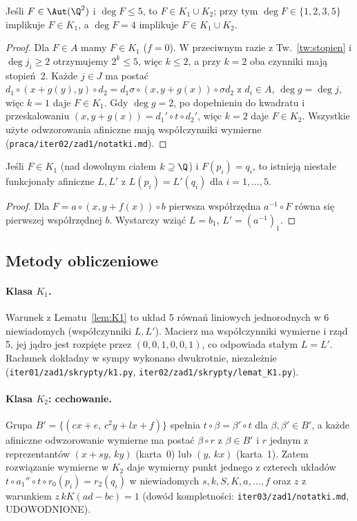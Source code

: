 \begin{stwierdzenie}\label{st:redukcja}
Jeśli $F\in\Aut(\Q^2)$ i $\deg F\le5$, to $F\in K_1\cup K_2$; przy tym $\deg F\in\{1,2,3,5\}$
implikuje $F\in K_1$, a $\deg F=4$ implikuje $F\in K_1\cup K_2$.
\end{stwierdzenie}
\begin{proof}
Dla $F\in A$ mamy $F\in K_1$ ($f=0$). W przeciwnym razie z Tw.~\ref{tw:stopien} i
$\deg j_i\ge2$ otrzymujemy $2^k\le5$, więc $k\le2$, a przy $k=2$ oba czynniki mają stopień~2.
Każde $j\in J$ ma postać $d_1\circ(x+g(y),y)\circ d_2=d_1\sigma\circ(x,y+g(x))\circ\sigma d_2$
z $d_i\in A$, $\deg g=\deg j$, więc $k=1$ daje $F\in K_1$. Gdy $\deg g=2$, po dopełnieniu
do kwadratu i przeskalowaniu $(x,y+g(x))=d_1'\circ t\circ d_2'$, więc $k=2$ daje
$F\in K_2$. Wszystkie użyte odwzorowania afiniczne mają współczynniki wymierne
(\texttt{praca/iter02/zad1/notatki.md}).
\end{proof}

\begin{lemat}[UDOWODNIONE]\label{lem:K1}
Jeśli $F\in K_1$ (nad dowolnym ciałem $k\supseteq\Q$) i $F(p_i)=q_i$, to istnieją niestałe
funkcjonały afiniczne $L,L'$ z $L(p_i)=L'(q_i)$ dla $i=1,\dots,5$.
\end{lemat}
\begin{proof}
Dla $F=a\circ(x,y+f(x))\circ b$ pierwsza współrzędna $a^{-1}\circ F$ równa się pierwszej
współrzędnej $b$. Wystarczy wziąć $L=b_1$, $L'=(a^{-1})_1$.
\end{proof}

\subsection{Metody obliczeniowe}
\paragraph{Klasa $K_1$.} Warunek z Lematu~\ref{lem:K1} to układ 5 równań liniowych
jednorodnych w 6 niewiadomych (współczynniki $L,L'$). Macierz ma współczynniki wymierne
i rząd 5, jej jądro jest rozpięte przez $(0,0,1,0,0,1)$, co odpowiada stałym $L=L'$.
Rachunek dokładny w sympy wykonano dwukrotnie, niezależnie
(\texttt{iter01/zad1/skrypty/k1.py}, \texttt{iter02/zad1/skrypty/lemat\_K1.py}).

\paragraph{Klasa $K_2$: cechowanie.} Grupa $B'=\{(cx+e,\,c^2y+lx+f)\}$ spełnia
$t\circ\beta=\beta'\circ t$ dla $\beta,\beta'\in B'$, a każde afiniczne odwzorowanie wymierne ma
postać $\beta\circ r$ z $\beta\in B'$ i $r$ jednym z reprezentantów $(x+sy,\,ky)$ (karta~0) lub
$(y,\,kx)$ (karta~1). Zatem rozwiązanie wymierne w $K_2$ daje wymierny punkt jednego z czterech
układów $t\circ a_1''\circ t\circ r_0(p_i)=r_2(q_i)$ w niewiadomych
$s,k,S,K,a,\dots,f$ oraz $z$ z warunkiem $z\,kK(ad-bc)=1$ (dowód kompletności:
\texttt{iter03/zad1/notatki.md}, UDOWODNIONE).

